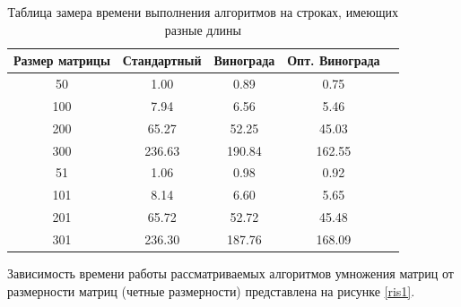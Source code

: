 \documentclass[a4paper,14pt, unknownkeysallowed]{extreport}
\begin{document}
	\begin{table} [h!]
        \captionsetup{justification=raggedright,singlelinecheck=off}
		\caption{Таблица замера времени выполнения алгоритмов на строках, имеющих разные длины}
		\label{table:t1}
		\begin{center}
			\begin{tabular}{|c | c | c | c | c|}
				
				\hline
				
				Размер матрицы & Стандартный & Винограда & Опт. Винограда \\ [0.5ex]
				
				\hline
				
				50 & 1.00 & 0.89 & 0.75\\ 
				
				\hline 
				
				100 & 7.94 & 6.56 & 5.46\\ 
				
				\hline 
				
				200 & 65.27 & 52.25 & 45.03\\
				
				\hline 
				
				300 & 236.63 & 190.84 & 162.55\\ 
				
				\hline 
				
				51 & 1.06 & 0.98 & 0.92\\ 
				
				\hline 
				
				101 & 8.14 & 6.60 & 5.65\\ 
				
				\hline 
				
				201 & 65.72 & 52.72 & 45.48\\
				
				\hline 
				
				301 & 236.30 & 187.76 & 168.09\\ 
				
				\hline 
			\end{tabular}
		\end{center}
	\end{table}

\clearpage

Зависимость времени работы рассматриваемых алгоритмов умножения матриц от размерности матриц (четные размерности) представлена на рисунке \ref{ris1}.
\end{document}
